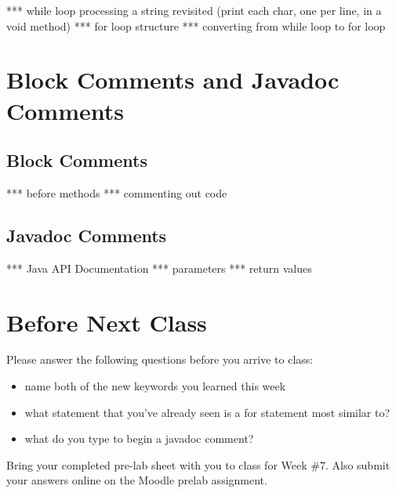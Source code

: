 *** while loop processing a string revisited (print each char, one per line, in a void method)
*** for loop structure
*** converting from while loop to for loop

\section{Block Comments and Javadoc Comments}

\subsection{Block Comments}
*** before methods
*** commenting out code
\subsection{Javadoc Comments}
*** Java API Documentation
*** parameters
*** return values

\section{Before Next Class}

Please answer the following questions before you arrive to class:

\begin{exer}

\begin{itemize}

\item name both of the new keywords you learned this week

  \evalline
  
\item what statement that you've already seen is a for statement most similar to?

  \evalline
  
\item what do you type to begin a javadoc comment?

  \evalline
  
\end{itemize}

\end{exer}

Bring your completed pre-lab sheet with you to class for Week \#7. Also submit your answers online on the Moodle prelab assignment.  


